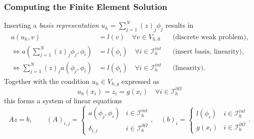 \documentclass[aspectratio=169,11pt]{beamer}
\theoremstyle{definition}
\begin{document}
\begin{frame}
\frametitle{Computing the Finite Element Solution}
Inserting a {\em basis representation} $u_h = \sum_{j=1}^N (z)_j \phi_j$ results in
\begin{align*}
a(u_h,v) &= l(v) \quad \forall v\in V_{h,0} &&\text{(discrete weak problem)},\nonumber \\
\Leftrightarrow
a\left(\sum_{j=1}^N (z)_j \phi_j,\phi_i\right) &= l(\phi_i) \quad \forall i\in \mathcal{I}_h^{int}
&&\text{(insert basis, linearity)}, \nonumber \\
\Leftrightarrow
\sum_{j=1}^N (z)_j a\left( \phi_j,\phi_i\right) &= l(\phi_i) \quad \forall i\in \mathcal{I}_h^{int}
&&\text{(linearity)}. \label{eq:linear1}
\end{align*}
Together with the condition $u_h\in V_{h,g}$ expressed as
\begin{equation*}
u_h(x_i) = z_i = g(x_i) \quad\forall i\in\mathcal{I}_h^{\partial\Omega}
\label{eq:linear2}
\end{equation*}
this forms a system of linear equations
\begin{equation*}
Az=b, \qquad
(A)_{i,j} = \left\{\begin{array}{ll}
a(\phi_j,\phi_i) & i\in\mathcal{I}_h^{int}\\
\delta_{i,j} & i\in\mathcal{I}_h^{\partial\Omega}
\end{array}\right., \quad
(b)_{i} = \left\{\begin{array}{ll}
l(\phi_i) & i\in\mathcal{I}_h^{int}\\
g(x_i) & i\in\mathcal{I}_h^{\partial\Omega}
\end{array}\right. .
\label{eq:systemdetail}
\end{equation*}
\end{frame}
\end{document}
